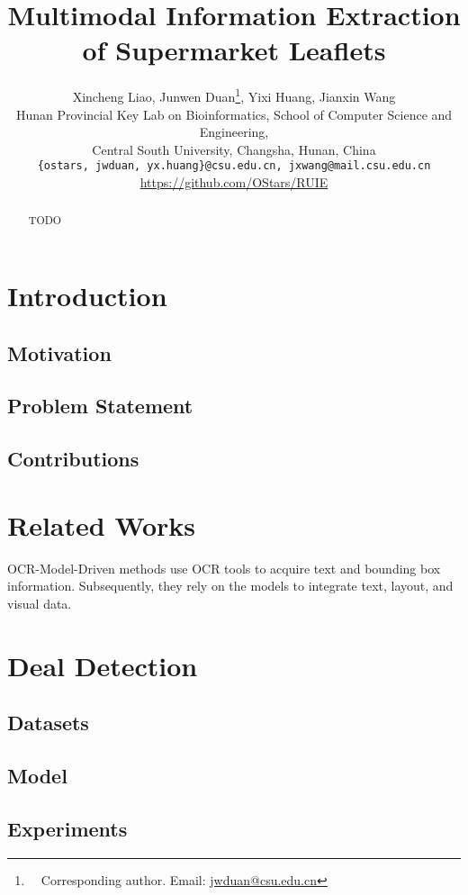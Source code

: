 \documentclass[11pt]{article}
\title{Multimodal Information Extraction of Supermarket Leaflets}
\author{Xincheng Liao\textsuperscript{}, Junwen Duan\textsuperscript{}\thanks{\ \ Corresponding author. Email: \href{mailto:jwduan@csu.edu.cn}{jwduan@csu.edu.cn}}, Yixi Huang\textsuperscript{}, Jianxin Wang\textsuperscript{} \\
Hunan Provincial Key Lab on Bioinformatics, School of Computer Science and Engineering, \\
Central South University, Changsha, Hunan, China \\
\texttt{\{ostars, jwduan, yx.huang\}@csu.edu.cn, jxwang@mail.csu.edu.cn} \\
\href{https://github.com/OStars/RUIE}{https://github.com/OStars/RUIE}
}
\begin{document}
\maketitle
\begin{abstract}
TODO
\end{abstract}

\section{Introduction}
\subsection{Motivation}
\subsection{Problem Statement}
\subsection{Contributions}

\section{Related Works}
OCR-Model-Driven methods use OCR tools to acquire text
and bounding box information. Subsequently, they rely
on the models to integrate text, layout, and visual data.


\section{Deal Detection}
    \subsection{Datasets}
    \subsection{Model}
    \subsection{Experiments}
\end{document}
